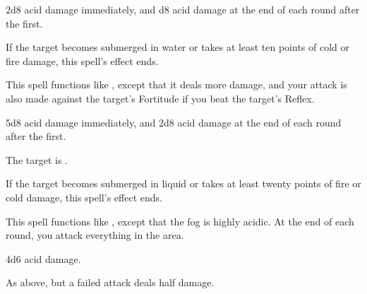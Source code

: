 \spellrng{\rngmed}
\begin{spellsuccess}
    2d8 acid damage immediately, and d8 acid damage at the end of each round after the first.
\end{spellsuccess}
\begin{spellnotes}
  If the target becomes submerged in water or takes at least ten points of cold or fire damage, this spell's effect ends.
\end{spellnotes}

\spellrng{\rngfar}
\begin{spelleffect}
  This spell functions like , except that it deals more damage, and your attack is also made against the target's Fortitude if you beat the target's Reflex.
\end{spelleffect}
\begin{spellsuccess}
    5d8 acid damage immediately, and 2d8 acid damage at the end of each round after the first.
\end{spellsuccess}
\begin{spellsuccess}
    The target is \vulnerable.
\end{spellsuccess}
\begin{spellnotes}
   If the target becomes submerged in liquid or takes at least twenty points of fire or cold damage, this spell's effect ends.
\end{spellnotes}

\spellrng{\rngmed}
\spelldur{\durshort}
\begin{spelleffect}
    This spell functions like , except that the fog is highly acidic. At the end of each round, you attack everything in the area.
\end{spelleffect}
\begin{spellsuccess}
    4d6 acid damage.
\end{spellsuccess}
\begin{spellfailure}
    As above, but a failed attack deals half damage.
\end{spellfailure}

